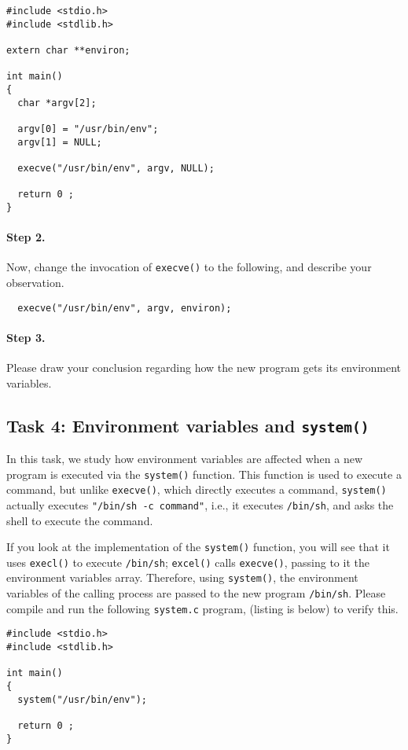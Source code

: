 \begin{Verbatim}[frame=single]
#include <stdio.h>
#include <stdlib.h>

extern char **environ;

int main()
{
  char *argv[2];

  argv[0] = "/usr/bin/env"; 
  argv[1] = NULL;

  execve("/usr/bin/env", argv, NULL);

  return 0 ;
}
\end{Verbatim}


\paragraph{Step 2.} Now, change the invocation of {\tt execve()} to the following, and 
describe your observation.
\begin{verbatim}
  execve("/usr/bin/env", argv, environ);
\end{verbatim}


\paragraph{Step 3.} Please draw your conclusion regarding how the new
program gets its environment variables. 


\subsection{Task 4: Environment variables and {\tt system()}}

In this task, we study how environment variables are affected 
when a new program is executed via the {\tt system()} function. This 
function is used to execute a command, but unlike
{\tt execve()}, which directly executes a command, {\tt system()}
actually executes {\tt "/bin/sh -c command"}, i.e., it
executes {\tt /bin/sh}, and asks the shell to execute the command.

If you look at the implementation of the {\tt system()} function, you will
see that it uses {\tt execl()} to execute {\tt /bin/sh}; {\tt excel()}
calls {\tt execve()}, passing to it the environment variables array. 
Therefore, using {\tt system()},  the environment variables of the calling process 
are passed to the new program {\tt /bin/sh}. Please compile and run the following 
{\tt system.c} program, (listing is below) to verify this. 


\begin{Verbatim}[frame=single]
#include <stdio.h>
#include <stdlib.h>

int main()
{
  system("/usr/bin/env");

  return 0 ;
}
\end{Verbatim}


